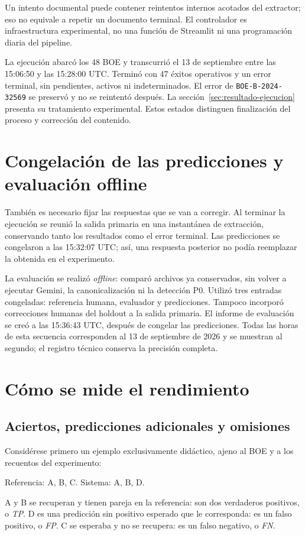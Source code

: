 Un intento documental puede contener reintentos internos acotados del
extractor; eso no equivale a repetir un documento terminal. El controlador es
infraestructura experimental, no una función de Streamlit ni una programación
diaria del pipeline.

La ejecución abarcó los 48 BOE y transcurrió el 13 de septiembre entre
las 15:06:50 y las 15:28:00 UTC. Terminó con 47 éxitos operativos y un error
terminal, sin pendientes, activos ni indeterminados. El error de
\texttt{BOE-B-2024-32569} se preservó y no se reintentó después.
La sección~\ref{sec:resultado-ejecucion} presenta su tratamiento experimental.
Estos estados distinguen finalización del proceso y corrección del contenido.

\section{Congelación de las predicciones y evaluación offline}
También es necesario fijar las respuestas que se van a corregir. Al terminar
la ejecución se reunió la salida primaria en una instantánea de extracción,
conservando tanto los resultados como el error terminal. Las predicciones
se congelaron a las 15:32:07 UTC; así, una respuesta posterior no podía
reemplazar la obtenida en el experimento.

La evaluación se realizó \emph{offline}: comparó archivos ya conservados,
sin volver a ejecutar Gemini, la canonicalización ni la detección P0.
Utilizó tres entradas congeladas: referencia humana, evaluador y predicciones.
Tampoco incorporó correcciones humanas del holdout a la salida primaria.
El informe de evaluación se creó a las 15:36:43 UTC, después de congelar
las predicciones. Todas las horas de esta secuencia corresponden al 13 de
septiembre de 2026 y se muestran al segundo; el registro técnico conserva
la precisión completa.

\section{Cómo se mide el rendimiento}
\label{sec:metricas-evaluacion}
\subsection{Aciertos, predicciones adicionales y omisiones}
Considérese primero un ejemplo exclusivamente didáctico, ajeno al BOE y a
los recuentos del experimento:
\begin{center}
Referencia: A, B, C. \qquad Sistema: A, B, D.
\end{center}
A y B se recuperan y tienen pareja en la referencia: son dos verdaderos
positivos, o \emph{TP}. D es una predicción sin positivo esperado que le
corresponda: es un falso positivo, o \emph{FP}. C se esperaba y no se
recupera: es un falso negativo, o \emph{FN}.

